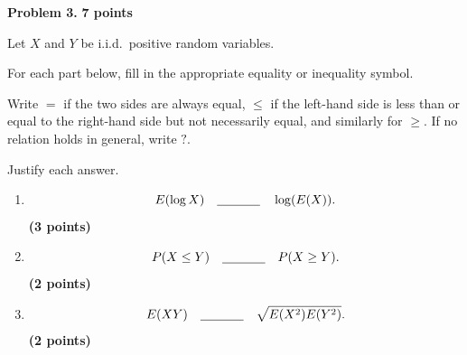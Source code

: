 \documentclass[11pt]{article}
\begin{document}
\newpage


\begin{problemheader}
\textbf{Problem 3.} \hfill \textbf{7 points}
\end{problemheader}

Let \(X\) and \(Y\) be i.i.d.\ positive random variables.

For each part below, fill in the appropriate equality or inequality symbol.

Write \(=\) if the two sides are always equal, \(\leq\) if the left-hand side
is less than or equal to the right-hand side but not necessarily equal, and
similarly for \(\geq\). If no relation holds in general, write \(?\).

Justify each answer.

\begin{enumerate}[label=(\alph*),leftmargin=*,itemsep=1.2em]

    \item
    \[
    E(\log X)
    \quad \underline{\hspace{1.2cm}} \quad
    \log(E(X)).
    \]
    \hfill \textbf{(3 points)}

    \item
    \[
    P(X\leq Y)
    \quad \underline{\hspace{1.2cm}} \quad
    P(X\geq Y).
    \]
    \hfill \textbf{(2 points)}

    \item
    \[
    E(XY)
    \quad \underline{\hspace{1.2cm}} \quad
    \sqrt{E(X^2)E(Y^2)}.
    \]
    \hfill \textbf{(2 points)}

\end{enumerate}
\end{document}
